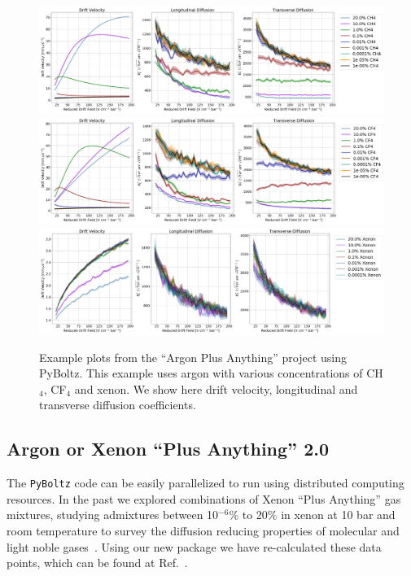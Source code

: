 \documentclass[3p,11pt]{elsarticle}
\begin{document}
\begin{figure}[t!]
\begin{centering}
\includegraphics[width=0.99\columnwidth]{Figures/Argon_CH4.png}
\includegraphics[width=0.99\columnwidth]{Figures/Argon_CF4.png}
\includegraphics[width=0.99\columnwidth]{Figures/Argon_Xenon.png}
\par\end{centering}
\caption{Example plots from the ``Argon Plus Anything'' project using PyBoltz. This example uses argon with various concentrations of CH$_4$, CF$_4$ and xenon. We show here drift velocity, longitudinal and transverse diffusion coefficients. \label{fig:test2}}
\end{figure}


\subsection{Argon or Xenon ``Plus Anything'' 2.0}
The {\tt PyBoltz} code can be easily parallelized to run using distributed computing resources.  In the past we explored combinations of Xenon ``Plus Anything'' gas mixtures, studying admixtures between 10$^{-6}$\% to 20\% in xenon at 10 bar and room temperature to survey the diffusion reducing properties of molecular and light noble gases~\cite{XePa}.  Using our new package we have re-calculated these data points, which can be found at Ref.~\cite{GitHubPlusAny}.
\end{document}
